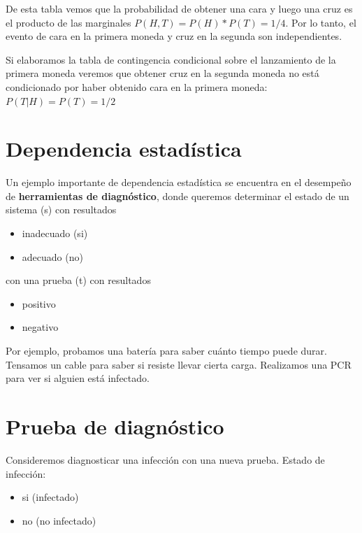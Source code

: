 \documentclass[
]{book}
\providecommand{\tightlist}{%
  \setlength{\itemsep}{0pt}\setlength{\parskip}{0pt}}
\begin{document}
De esta tabla vemos que la probabilidad de obtener una cara y luego una cruz es el producto de las marginales \(P(H, T)=P(H)*P(T)=1/4\). Por lo tanto, el evento de cara en la primera moneda y cruz en la segunda son independientes.

Si elaboramos la tabla de contingencia condicional sobre el lanzamiento de la primera moneda veremos que obtener cruz en la segunda moneda no está condicionado por haber obtenido cara en la primera moneda: \(P(T|H)=P(T) =1/2\)

\hypertarget{dependencia-estaduxedstica}{%
\section{Dependencia estadística}\label{dependencia-estaduxedstica}}

Un ejemplo importante de dependencia estadística se encuentra en el desempeño de \textbf{herramientas de diagnóstico}, donde queremos determinar el estado de un sistema (s) con resultados

\begin{itemize}
\tightlist
\item
  inadecuado (si)
\item
  adecuado (no)
\end{itemize}

con una prueba (t) con resultados

\begin{itemize}
\tightlist
\item
  positivo
\item
  negativo
\end{itemize}

Por ejemplo, probamos una batería para saber cuánto tiempo puede durar. Tensamos un cable para saber si resiste llevar cierta carga. Realizamos una PCR para ver si alguien está infectado.

\hypertarget{prueba-de-diagnuxf3stico}{%
\section{Prueba de diagnóstico}\label{prueba-de-diagnuxf3stico}}

Consideremos diagnosticar una infección con una nueva prueba. Estado de infección:

\begin{itemize}
\tightlist
\item
  si (infectado)
\item
  no (no infectado)
\end{itemize}
\end{document}
